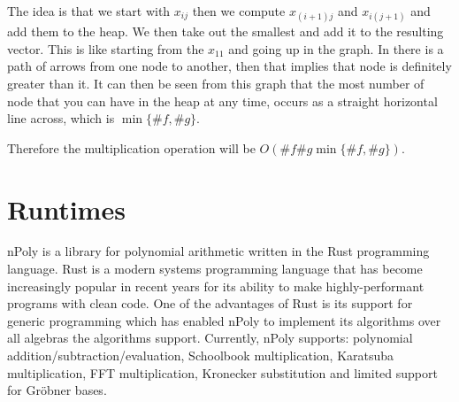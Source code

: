 The idea is that we start with $x_{ij}$ then we compute $x_{(i+1)j}$ and $x_{i(j+1)}$ and add them to the heap. We then take out the smallest and add it to the resulting vector. This is like starting from the $x_{11}$ and going up in the graph. In there is a path of arrows from one node to another, then that implies that node is definitely greater than it. It can then be seen from this graph that the most number of node that you can have in the heap at any time, occurs as a straight horizontal line across, which is $\min\{\# f, \# g\}$.


Therefore the multiplication operation will be $O(\# f \# g \min\{\# f, \# g\})$.





\section{Runtimes}

nPoly is a library for polynomial arithmetic written in the Rust programming language. Rust is a modern systems programming language that has become increasingly popular in recent years for its ability to make highly-performant programs with clean code.
One of the advantages of Rust is its support for generic programming which has enabled nPoly to implement its algorithms over all algebras the algorithms support. Currently, nPoly supports: polynomial addition/subtraction/evaluation, Schoolbook multiplication, Karatsuba multiplication, FFT multiplication, Kronecker substitution and limited support for Gr\"{o}bner bases.

